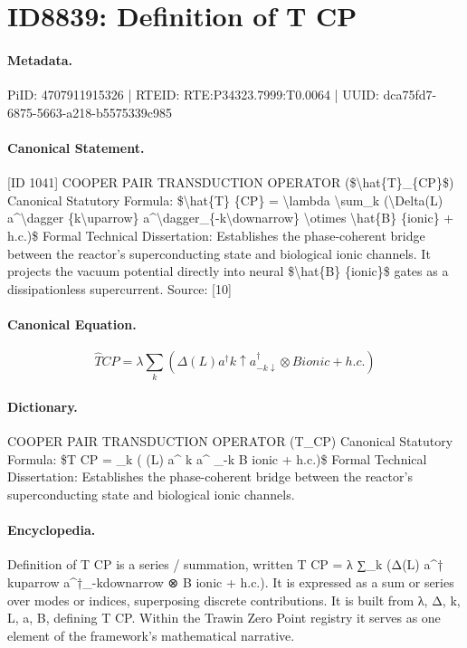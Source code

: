 \section*{ID8839: Definition of T CP}
\paragraph{Metadata.}
PiID: 4707911915326 | RTEID: RTE:P34323.7999:T0.0064 | UUID: dca75fd7-6875-5663-a218-b5575339c985

\paragraph{Canonical Statement.}
[ID 1041] COOPER PAIR TRANSDUCTION OPERATOR (\$\textbackslash{}hat\{T\}\_\{CP\}\$) Canonical Statutory Formula: \$\textbackslash{}hat\{T\} \{CP\} = \textbackslash{}lambda \textbackslash{}sum\_k (\textbackslash{}Delta(L) a\textasciicircum{}\textbackslash{}dagger \{k\textbackslash{}uparrow\} a\textasciicircum{}\textbackslash{}dagger\_\{-k\textbackslash{}downarrow\} \textbackslash{}otimes \textbackslash{}hat\{B\} \{ionic\} + h.c.)\$ Formal Technical Dissertation: Establishes the phase-coherent bridge between the reactor's superconducting state and biological ionic channels. It projects the vacuum potential directly into neural \$\textbackslash{}hat\{B\} \{ionic\}\$ gates as a dissipationless supercurrent. Source: [10]

\paragraph{Canonical Equation.}
\[
\hat{T} {CP} = \lambda \sum_k (\Delta(L) a^\dagger {k\uparrow} a^\dagger_{-k\downarrow} \otimes \hat{B} {ionic} + h.c.)
\]

\paragraph{Dictionary.}
COOPER PAIR TRANSDUCTION OPERATOR (T\_CP) Canonical Statutory Formula: \$T CP = \_k ( (L) a\textasciicircum{} k a\textasciicircum{} \_-k B ionic + h.c.)\$ Formal Technical Dissertation: Establishes the phase-coherent bridge between the reactor's superconducting state and biological ionic channels.

\paragraph{Encyclopedia.}
Definition of T CP is a series / summation, written T CP = λ ∑\_k (Δ(L) a\textasciicircum{}† kuparrow a\textasciicircum{}†\_-kdownarrow ⊗ B ionic + h.c.). It is expressed as a sum or series over modes or indices, superposing discrete contributions. It is built from λ, Δ, k, L, a, B, defining T CP. Within the Trawin Zero Point registry it serves as one element of the framework's mathematical narrative.
